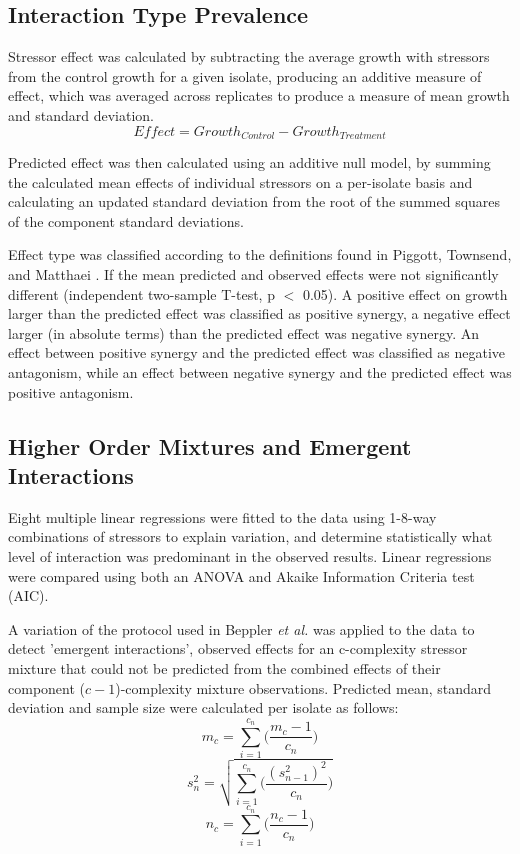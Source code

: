 \documentclass[final,1p,times]{elsarticle}
\begin{document}
\subsection{Interaction Type Prevalence}
\label{S:2:9}
Stressor effect was calculated by subtracting the average growth with stressors from the control growth for a given isolate, producing an additive measure of effect, which was averaged across replicates to produce a measure of mean growth and standard deviation.
\begin{equation}
Effect = Growth_{Control} - Growth_{Treatment}
\label{E:effect_calc}
\end{equation}

Predicted effect was then calculated using an additive null model, by summing the calculated mean effects of individual stressors on a per-isolate basis and calculating an updated standard deviation from the root of the summed squares of the component standard deviations. 

Effect type was classified according to the definitions found in Piggott, Townsend, and Matthaei \cite{Piggott2015}. If the mean predicted and observed effects were not significantly different (independent two-sample T-test, p $<$ 0.05). A positive effect on growth larger than the predicted effect was classified as positive synergy, a negative effect larger (in absolute terms) than the predicted effect was negative synergy. An effect between positive synergy and the predicted effect was classified as negative antagonism, while an effect between negative synergy and the predicted effect was positive antagonism. 

\subsection{Higher Order Mixtures and Emergent Interactions}
\label{S:2:10}
Eight multiple linear regressions were fitted to the data using 1-8-way combinations of stressors to explain variation, and determine statistically what level of interaction was predominant in the observed results. Linear regressions were compared using both an ANOVA and Akaike Information Criteria test (AIC). 

A variation of the protocol used in Beppler \textit{et al.} \cite{Beppler2016UncoveringStressors} was applied to the data to detect 'emergent interactions', observed effects for an c-complexity stressor mixture that could not be predicted from the combined effects of their component ($c-1$)-complexity mixture observations. Predicted mean, standard deviation and sample size were calculated per isolate as follows: 
\begin{equation}
    m_c = \sum_{i = 1}^{c_n}\Big(\frac{m_c-1}{c_n}\Big)
\label{E:pred_mean}    
\end{equation}
\begin{equation}
    s^2_n = \sqrt{\sum_{i = 1}^{c_n}\bigg(\frac{(s^2_{n-1})^2}{c_n}\bigg)}
\label{E:pred_sd}    
\end{equation}
\begin{equation}
    n_c = \sum_{i = 1}^{c_n}\Big(\frac{n_c-1}{c_n}\Big)
\label{E:pred_n}    
\end{equation}
\end{document}
